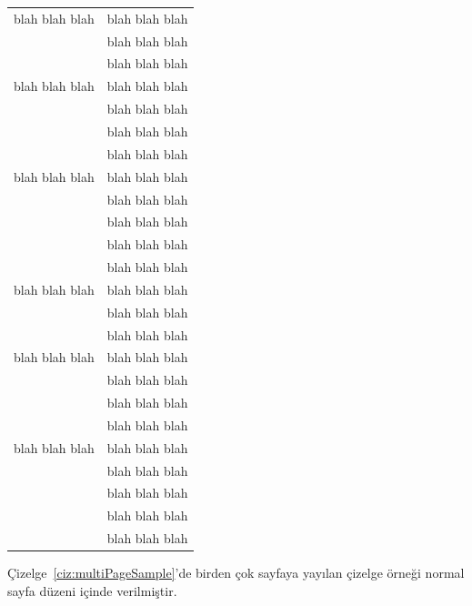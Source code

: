 \documentclass[a4paper,oneside,12pt]{report}
\begin{document}
\begin{center}
\begin{longtable}{ll}
		blah blah blah & blah blah blah \\
		& blah blah blah \\
		& blah blah blah \\
		
		blah blah blah & blah blah blah \\
		& blah blah blah \\
		& blah blah blah \\
		& blah blah blah \\
		
		blah blah blah & blah blah blah \\
		& blah blah blah \\
		& blah blah blah \\
		& blah blah blah \\
		& blah blah blah \\
		blah blah blah & blah blah blah \\
		& blah blah blah \\
		& blah blah blah \\
		
		blah blah blah & blah blah blah \\
		& blah blah blah \\
		& blah blah blah \\
		& blah blah blah \\
		
		blah blah blah & blah blah blah \\ \hline
		& blah blah blah \\
		& blah blah blah \\
		& blah blah blah \\
		& blah blah blah \\\hline
	\end{longtable}
\vskip -48pt%
\end{center}
Çizelge~\ref{ciz:multiPageSample}'de birden çok sayfaya yayılan çizelge örneği normal sayfa düzeni içinde verilmiştir.

\lipsum[1-2]
\end{document}
